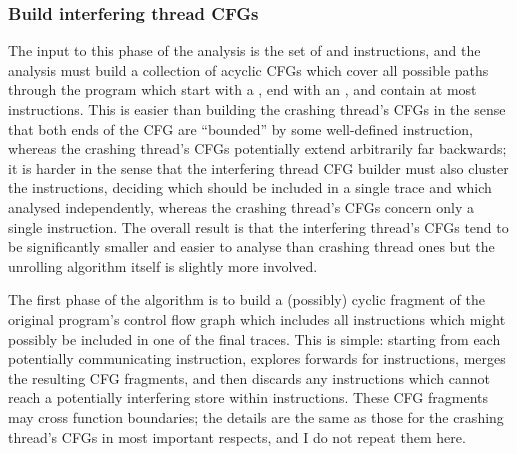\subsubsection{Build interfering thread CFGs}

The input to this phase of the analysis is the set of
 and  instructions, and
the analysis must build a collection of acyclic CFGs which cover all
possible paths through the program which start with a
, end with an , and contain at most \backref{$\alpha$} instructions.  This
is easier than building the crashing thread's CFGs in the sense that
both ends of the CFG are ``bounded'' by some well-defined instruction,
whereas the crashing thread's CFGs potentially extend arbitrarily far
backwards; it is harder in the sense that the interfering thread CFG
builder must also cluster the instructions, deciding which should be
included in a single trace and which analysed independently, whereas
the crashing thread's CFGs concern only a single instruction.  The
overall result is that the interfering thread's CFGs tend to be
significantly smaller and easier to analyse than crashing thread ones
but the unrolling algorithm itself is slightly more involved.

The first phase of the algorithm is to build a (possibly) cyclic
fragment of the original program's control flow graph which includes
all instructions which might possibly be included in one of the final
traces.  This is simple: starting from each potentially communicating
instruction, {\technique} explores forwards for \backref{$\alpha$}
instructions, merges the resulting CFG fragments, and then discards
any instructions which cannot reach a potentially interfering store
within \backref{$\alpha$} instructions.  These CFG fragments may cross
function boundaries; the details are the same as those for the
crashing thread's CFGs in most important respects, and I do not repeat
them here.

